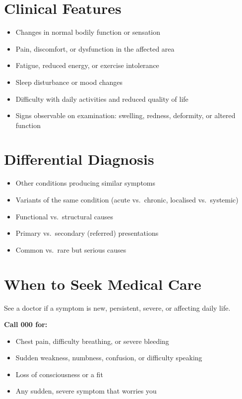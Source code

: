 \section*{Clinical Features}
\begin{itemize}
    \item Changes in normal bodily function or sensation
    \item Pain, discomfort, or dysfunction in the affected area
    \item Fatigue, reduced energy, or exercise intolerance
    \item Sleep disturbance or mood changes
    \item Difficulty with daily activities and reduced quality of life
    \item Signs observable on examination: swelling, redness, deformity, or altered function
\end{itemize}

\section*{Differential Diagnosis}
\begin{itemize}
    \item Other conditions producing similar symptoms
    \item Variants of the same condition (acute vs.\ chronic, localised vs.\ systemic)
    \item Functional vs.\ structural causes
    \item Primary vs.\ secondary (referred) presentations
    \item Common vs.\ rare but serious causes
\end{itemize}

\section*{When to Seek Medical Care}
See a doctor if a symptom is new, persistent, severe, or affecting daily life.

\textbf{Call 000 for:}
\begin{itemize}
    \item Chest pain, difficulty breathing, or severe bleeding
    \item Sudden weakness, numbness, confusion, or difficulty speaking
    \item Loss of consciousness or a fit
    \item Any sudden, severe symptom that worries you
\end{itemize}

